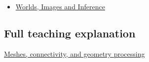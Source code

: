 \begin{itemize}
\tightlist
\item
  \href{Continuous\%20Notes/University\%20-\%20Worlds,\%20Images\%20and\%20Inference\%20-\%20Graphics,\%20Vision\%20and\%20Photography}{Worlds, Images and Inference}
\end{itemize}

\subsection{Full teaching explanation}\label{full-teaching-explanation}

\href{Continuous\%20Notes/University\%20-\%20Worlds,\%20Images\%20and\%20Inference\%20-\%20Graphics,\%20Vision\%20and\%20Photography\#Meshes,\%20connectivity,\%20and\%20geometry\%20processing}{Meshes, connectivity, and geometry processing}
